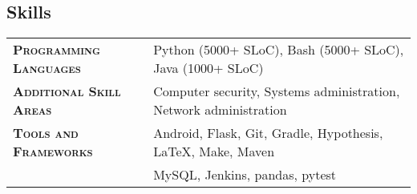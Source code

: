 \documentclass[letterpaper, oneside, final, 10pt]{scrartcl} %
\begin{document}
\begin{center}
\vspace{-16pt} %


\section{Skills}

\begin{tabularx}{\linewidth}{>{\scshape}p{2in}X}
\textbf{Programming Languages} & Python (5000+ SLoC), Bash (5000+ SLoC), Java (1000+ SLoC)\\
\textbf{Additional Skill Areas} & Computer security, Systems administration, Network administration\\
\textbf{Tools and Frameworks} & Android, Flask, Git, Gradle, Hypothesis, \LaTeX, Make, Maven\\
							  & MySQL, Jenkins, pandas, pytest
\end{tabularx}


\end{center}


\renewcommand{\headfont}{\normalfont\rmfamily\scshape} %


\end{document}
